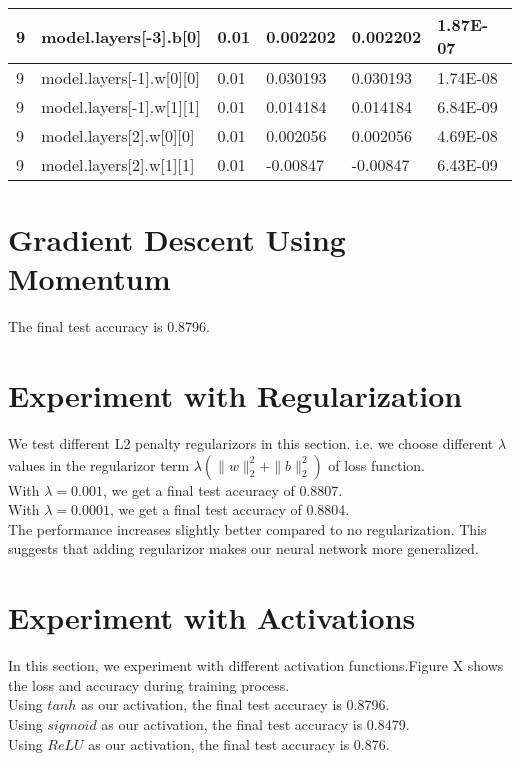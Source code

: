 \documentclass{article} %
\begin{document}
\begin{table}[]
\begin{tabular}{|l|l|l|l|l|l|}
9              & model.layers{[}-3{]}.b{[}0{]}        & 0.01             & 0.002202          & 0.002202        & 1.87E-07       \\ \hline
9              & model.layers{[}-1{]}.w{[}0{]}{[}0{]} & 0.01             & 0.030193          & 0.030193        & 1.74E-08       \\ \hline
9              & model.layers{[}-1{]}.w{[}1{]}{[}1{]} & 0.01             & 0.014184          & 0.014184        & 6.84E-09       \\ \hline
9              & model.layers{[}2{]}.w{[}0{]}{[}0{]}  & 0.01             & 0.002056          & 0.002056        & 4.69E-08       \\ \hline
9              & model.layers{[}2{]}.w{[}1{]}{[}1{]}  & 0.01             & -0.00847          & -0.00847        & 6.43E-09       \\ \hline
\end{tabular}
\end{table}
\section{Gradient Descent Using Momentum}
The final test accuracy is 0.8796.\\


\section{Experiment with Regularization}
We test different L2 penalty regularizors in this section. i.e. we choose different $\lambda$ values in the regularizor term $\lambda (\parallel w \parallel_2^2+\parallel b \parallel_2^2)$ of loss function. \\
With $\lambda = 0.001$, we get a final test accuracy of 0.8807. \\
With $\lambda = 0.0001$, we get a final test accuracy of 0.8804. \\

The performance increases slightly better compared to no regularization. This suggests that adding regularizor makes our neural network more generalized.


\section{Experiment with Activations}
In this section, we experiment with different activation functions.Figure X shows the loss and accuracy during training process.\\
Using $tanh$ as our activation, the final test accuracy is 0.8796. \\
Using $sigmoid$ as our activation, the final test accuracy is 0.8479. \\
Using $ReLU$ as our activation, the final test accuracy is 0.876. \\
\end{document}
